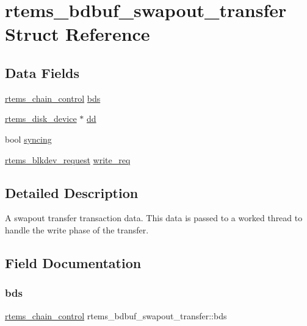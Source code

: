 \hypertarget{structrtems__bdbuf__swapout__transfer}{}\section{rtems\+\_\+bdbuf\+\_\+swapout\+\_\+transfer Struct Reference}
\label{structrtems__bdbuf__swapout__transfer}
\subsection*{Data Fields}
\begin{DoxyCompactItemize}
\item 
\mbox{\hyperlink{unionChain__Control}{rtems\+\_\+chain\+\_\+control}} \mbox{\hyperlink{structrtems__bdbuf__swapout__transfer_a5a9d94d15286794fe4dce7e048460f8e}{bds}}
\item 
\mbox{\hyperlink{structrtems__disk__device}{rtems\+\_\+disk\+\_\+device}} $\ast$ \mbox{\hyperlink{structrtems__bdbuf__swapout__transfer_acd48a63645769f66f2e62724b18b404f}{dd}}
\item 
bool \mbox{\hyperlink{structrtems__bdbuf__swapout__transfer_a57c2629640f84cdbfea289c937d57979}{syncing}}
\item 
\mbox{\hyperlink{structrtems__blkdev__request}{rtems\+\_\+blkdev\+\_\+request}} \mbox{\hyperlink{structrtems__bdbuf__swapout__transfer_ae6062478ca23de76a9272537bf25e8fc}{write\+\_\+req}}
\end{DoxyCompactItemize}


\subsection{Detailed Description}
A swapout transfer transaction data. This data is passed to a worked thread to handle the write phase of the transfer. 

\subsection{Field Documentation}
\mbox{\label{structrtems__bdbuf__swapout__transfer_a5a9d94d15286794fe4dce7e048460f8e}} 
\subsubsection{\texorpdfstring{bds}{bds}}
{\footnotesize\ttfamily \mbox{\hyperlink{unionChain__Control}{rtems\+\_\+chain\+\_\+control}} rtems\+\_\+bdbuf\+\_\+swapout\+\_\+transfer\+::bds}

